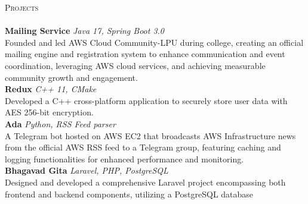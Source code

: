 \documentclass[a4paper]{article}
\newcommand{\lineunder} {
    \vspace*{-8pt} \\
    \hspace*{-18pt} \hrulefill \\
}
\newcommand{\header} [1] {
    {\hspace*{-18pt}\vspace*{6pt} \textsc{#1}}
    \vspace*{-6pt} \lineunder
}
\begin{document}
\header{Projects}
{\textbf{Mailing Service}} {\sl Java 17, Spring Boot 3.0} \hfill \href{https://github.com/AWS-Cloud-Community-LPU/mailing-service}{\faGithub}\\
Founded and led AWS Cloud Community-LPU during college, creating an official mailing engine and registration system to enhance communication and event coordination, leveraging AWS cloud services, and achieving measurable community growth and engagement.\\
\vspace*{2mm}
{\textbf{Redux}} {\sl C++ 11, CMake} \hfill \href{https://github.com/garvit-joshi/Redux}{\faGithub}\\
Developed a C++ cross-platform application to securely store user data with AES 256-bit encryption.\\
\vspace*{2mm}
{\textbf{Ada}} {\sl Python, RSS Feed parser} \hfill \href{https://github.com/AWS-Cloud-Community-LPU/Ada\_TelegramBot}{\faGithub}\\
A Telegram bot hosted on AWS EC2 that broadcasts AWS Infrastructure news from the official AWS RSS feed to a Telegram group, featuring caching and logging functionalities for enhanced performance and monitoring.\\
\vspace*{2mm}
{\textbf{Bhagavad Gita}} {\sl Laravel, PHP, PostgreSQL} \hfill \href{https://github.com/garvit-joshi/Bhagavad-Gita}{\faGithub}\\
Designed and developed a comprehensive Laravel project encompassing both frontend and backend components, utilizing a PostgreSQL database\\
\vspace*{2mm}



\ 
\end{document}
